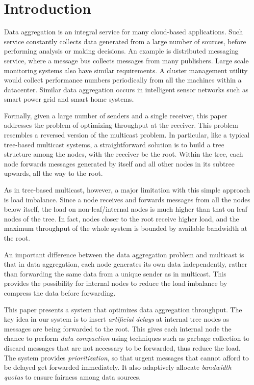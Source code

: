 \section{Introduction}\label{sec:intro}

Data aggregation is an integral service for many cloud-based applications.
Such service constantly collects data generated from a large number of sources,
before performing analysis or making decisions.  An example is distributed
messaging service, where a message bus collects messages from many publishers.
Large scale monitoring systems also have similar requirements.  A cluster
management utility would collect performance numbers periodically from all the
machines within a datacenter.  Similar data aggregation occurs in intelligent
sensor networks such as smart power grid and smart home systems.

Formally, given a large number of senders and a single receiver, this paper
addresses the problem of optimizing throughput at the receiver.  This problem
resembles a reversed version of the multicast problem.  In particular, like a
typical tree-based multicast systems, a straightforward solution is to build a
tree structure among the nodes, with the receiver be the root.  Within the tree,
each node forwards messages generated by itself and all other nodes in its
subtree upwards, all the way to the root.

As in tree-based multicast, however, a major limitation with this simple
approach is load imbalance.  Since a node receives and forwards messages from
all the nodes below itself, the load on non-leaf/internal nodes is much higher
than that on leaf nodes of the tree.  In fact, nodes closer to the root receive
higher load, and the maximum throughput of the whole system is bounded by
available bandwidth at the root.

An important difference between the data aggregation problem and multicast is
that in data aggregation, each node generates its own data independently, rather
than forwarding the same data from a unique sender as in multicast.  This
provides the possibility for internal nodes to reduce the load imbalance by
compress the data before forwarding.

This paper presents a system that optimizes data aggregation throughput.  The
key idea in our system is to insert \emph{artificial delays} at internal tree
nodes as messages are being forwarded to the root.  This gives each internal
node the chance to perform \emph{data compaction} using techniques such as
garbage collection to discard messages that are not necessary to be forwarded,
thus reduce the load.  The system provides \emph{prioritization}, so that
urgent messages that cannot afford to be delayed get forwarded immediately.  It
also adaptively allocate \emph{bandwidth quotas} to ensure fairness among data
sources.

